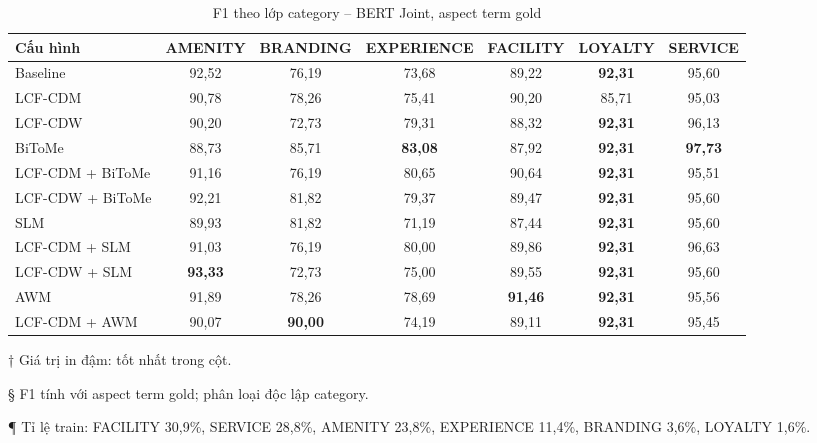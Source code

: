 \begin{table}[H]
\centering
\small
\caption{F1 theo lớp category -- BERT Joint, aspect term gold}
\label{tab:cat_perclass_avg}
\begin{threeparttable}
\begin{tabular}{@{}lcccccc@{}}
\toprule
\textbf{Cấu hình}
  & \textbf{AMENITY} & \textbf{BRANDING} & \textbf{EXPERIENCE}
  & \textbf{FACILITY} & \textbf{LOYALTY} & \textbf{SERVICE} \\
\midrule
Baseline
  & 92,52 & 76,19 & 73,68 & 89,22 & \textbf{92,31} & 95,60 \\
\midrule
LCF-CDM
  & 90,78 & 78,26 & 75,41 & 90,20 & 85,71 & 95,03 \\
LCF-CDW
  & 90,20 & 72,73 & 79,31 & 88,32 & \textbf{92,31} & 96,13 \\
\midrule
BiToMe
  & 88,73 & 85,71 & \textbf{83,08} & 87,92 & \textbf{92,31} & \textbf{97,73} \\
LCF-CDM + BiToMe
  & 91,16 & 76,19 & 80,65 & 90,64 & \textbf{92,31} & 95,51 \\
LCF-CDW + BiToMe
  & 92,21 & 81,82 & 79,37 & 89,47 & \textbf{92,31} & 95,60 \\
\midrule
SLM
  & 89,93 & 81,82 & 71,19 & 87,44 & \textbf{92,31} & 95,60 \\
LCF-CDM + SLM
  & 91,03 & 76,19 & 80,00 & 89,86 & \textbf{92,31} & 96,63 \\
LCF-CDW + SLM
  & \textbf{93,33} & 72,73 & 75,00 & 89,55 & \textbf{92,31} & 95,60 \\
\midrule
AWM
  & 91,89 & 78,26 & 78,69 & \textbf{91,46} & \textbf{92,31} & 95,56 \\
LCF-CDM + AWM
  & 90,07 & \textbf{90,00} & 74,19 & 89,11 & \textbf{92,31} & 95,45 \\
\bottomrule
\end{tabular}
\begin{tablenotes}
  \small
  \item[†] Giá trị in đậm: tốt nhất trong cột.
  \item[§] F1 tính với aspect term gold; phân loại độc lập category.
  \item[¶] Tỉ lệ train: FACILITY 30,9\%, SERVICE 28,8\%, AMENITY 23,8\%,
        EXPERIENCE 11,4\%, BRANDING 3,6\%, LOYALTY 1,6\%.
\end{tablenotes}
\end{threeparttable}
\end{table}

